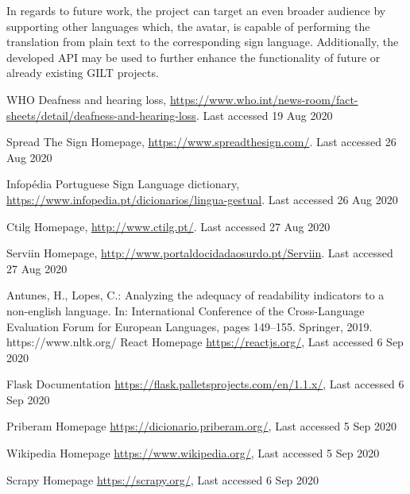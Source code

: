 \documentclass[runningheads]{llncs}
\begin{document}
In regards to future work, the project can target an even broader audience by supporting other languages which, the avatar, is capable of performing the translation from plain text to the corresponding sign language.
Additionally, the developed API may be used to further enhance the functionality of future or already existing GILT projects.


%
%
%
% 
% 
%
\begin{thebibliography}{8}
        WHO Deafness and hearing loss, \url{https://www.who.int/news-room/fact-sheets/detail/deafness-and-hearing-loss}. Last accessed 19 Aug 2020

        Spread The Sign Homepage, \url{https://www.spreadthesign.com/}. Last accessed 26 Aug 2020

        Infopédia Portuguese Sign Language dictionary, \url{https://www.infopedia.pt/dicionarios/lingua-gestual}. Last accessed 26 Aug 2020

        Ctilg Homepage, \url{http://www.ctilg.pt/}. Last accessed 27 Aug 2020

        Serviin Homepage, \url{http://www.portaldocidadaosurdo.pt/Serviin}. Last accessed 27 Aug 2020

        Antunes, H., Lopes, C.: Analyzing the adequacy of readability indicators to a non-english language.
        In: International Conference of the Cross-Language Evaluation Forum for European Languages,
        pages 149--155. Springer, 2019.
https://www.nltk.org/
        React Homepage \url{https://reactjs.org/}, Last accessed 6 Sep 2020

        Flask Documentation \url{https://flask.palletsprojects.com/en/1.1.x/}, Last accessed 6 Sep 2020

        Priberam Homepage \url{https://dicionario.priberam.org/}, Last accessed 5 Sep 2020

        Wikipedia Homepage \url{https://www.wikipedia.org/}, Last accessed 5 Sep 2020

        Scrapy Homepage \url{https://scrapy.org/}, Last accessed 6 Sep 2020


\end{thebibliography}
\end{document}
